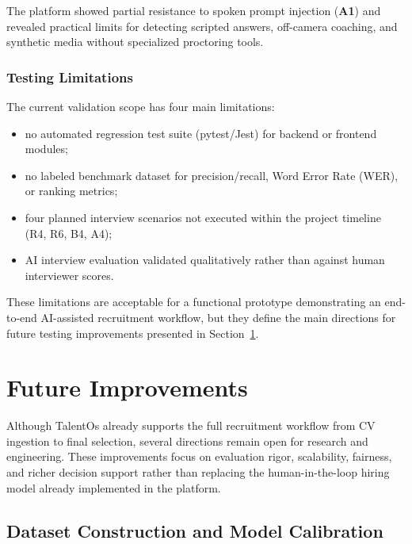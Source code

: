 The platform showed partial resistance to spoken prompt injection (\textbf{A1}) and revealed practical limits for detecting scripted answers, off-camera coaching, and synthetic media without specialized proctoring tools.

\subsubsection{Testing Limitations}
\label{sec:ch5:testing_limitations}

The current validation scope has four main limitations:
\begin{itemize}
    \item no automated regression test suite (pytest/Jest) for backend or frontend modules;
    \item no labeled benchmark dataset for precision/recall, Word Error Rate (WER), or ranking metrics;
    \item four planned interview scenarios not executed within the project timeline (R4, R6, B4, A4);
    \item AI interview evaluation validated qualitatively rather than against human interviewer scores.
\end{itemize}

These limitations are acceptable for a functional prototype demonstrating an end-to-end AI-assisted recruitment workflow, but they define the main directions for future testing improvements presented in Section~\ref{sec:ch5:future_improvements}.

\section{Future Improvements}
\label{sec:ch5:future_improvements}

Although TalentOs already supports the full recruitment workflow from CV ingestion to final selection, several directions remain open for research and engineering. These improvements focus on evaluation rigor, scalability, fairness, and richer decision support rather than replacing the human-in-the-loop hiring model already implemented in the platform.

\subsection{Dataset Construction and Model Calibration}

